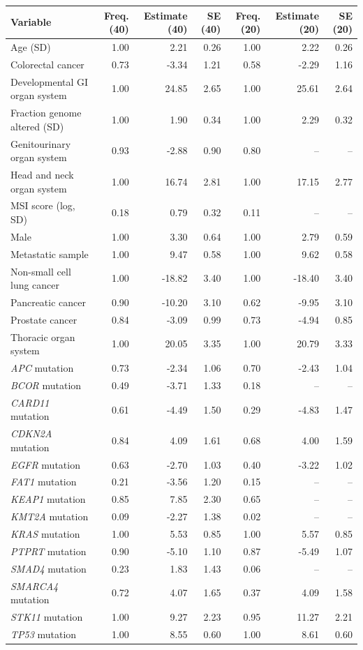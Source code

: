 \begin{tabular}{lrrrrrr}
\toprule
Variable & Freq. (40) & Estimate (40) & SE (40) & Freq. (20) & Estimate (20) & SE (20)\\
\midrule
Age (SD) & 1.00 & 2.21 & 0.26 & 1.00 & 2.22 & 0.26\\
Colorectal cancer & 0.73 & -3.34 & 1.21 & 0.58 & -2.29 & 1.16\\
Developmental GI organ system & 1.00 & 24.85 & 2.65 & 1.00 & 25.61 & 2.64\\
Fraction genome altered (SD) & 1.00 & 1.90 & 0.34 & 1.00 & 2.29 & 0.32\\
Genitourinary organ system & 0.93 & -2.88 & 0.90 & 0.80 & -- & --\\
Head and neck organ system & 1.00 & 16.74 & 2.81 & 1.00 & 17.15 & 2.77\\
MSI score (log, SD) & 0.18 & 0.79 & 0.32 & 0.11 & -- & --\\
Male & 1.00 & 3.30 & 0.64 & 1.00 & 2.79 & 0.59\\
Metastatic sample & 1.00 & 9.47 & 0.58 & 1.00 & 9.62 & 0.58\\
Non-small cell lung cancer & 1.00 & -18.82 & 3.40 & 1.00 & -18.40 & 3.40\\
Pancreatic cancer & 0.90 & -10.20 & 3.10 & 0.62 & -9.95 & 3.10\\
Prostate cancer & 0.84 & -3.09 & 0.99 & 0.73 & -4.94 & 0.85\\
Thoracic organ system & 1.00 & 20.05 & 3.35 & 1.00 & 20.79 & 3.33\\
\textit{APC} mutation & 0.73 & -2.34 & 1.06 & 0.70 & -2.43 & 1.04\\
\textit{BCOR} mutation & 0.49 & -3.71 & 1.33 & 0.18 & -- & --\\
\textit{CARD11} mutation & 0.61 & -4.49 & 1.50 & 0.29 & -4.83 & 1.47\\
\textit{CDKN2A} mutation & 0.84 & 4.09 & 1.61 & 0.68 & 4.00 & 1.59\\
\textit{EGFR} mutation & 0.63 & -2.70 & 1.03 & 0.40 & -3.22 & 1.02\\
\textit{FAT1} mutation & 0.21 & -3.56 & 1.20 & 0.15 & -- & --\\
\textit{KEAP1} mutation & 0.85 & 7.85 & 2.30 & 0.65 & -- & --\\
\textit{KMT2A} mutation & 0.09 & -2.27 & 1.38 & 0.02 & -- & --\\
\textit{KRAS} mutation & 1.00 & 5.53 & 0.85 & 1.00 & 5.57 & 0.85\\
\textit{PTPRT} mutation & 0.90 & -5.10 & 1.10 & 0.87 & -5.49 & 1.07\\
\textit{SMAD4} mutation & 0.23 & 1.83 & 1.43 & 0.06 & -- & --\\
\textit{SMARCA4} mutation & 0.72 & 4.07 & 1.65 & 0.37 & 4.09 & 1.58\\
\textit{STK11} mutation & 1.00 & 9.27 & 2.23 & 0.95 & 11.27 & 2.21\\
\textit{TP53} mutation & 1.00 & 8.55 & 0.60 & 1.00 & 8.61 & 0.60\\
\bottomrule
\end{tabular}
